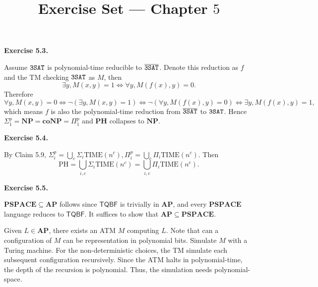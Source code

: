 \documentclass[a4paper]{article}
\title{Exercise Set --- Chapter $5$}
\date{}
\newenvironment{exercise}[1]{
	\par
	\noindent\textbf{Exercise #1.}\quad
}{
	\par
	\bigskip
}
\newcommand{\pbra}[1]{\left( #1 \right)}
\begin{document}
\maketitle

\begin{exercise}{5.3}
    Assume $\tt 3SAT$ is polynomial-time reducible to $\overline{\tt 3SAT}$. Denote this reduction as $f$ and the TM checking
    $\tt 3SAT$ as $M$, then
    $$
    \exists y,M(x,y)=1\iff \forall y,M(f(x),y)=0.
    $$
    Therefore
    $$
    \forall y,M(x,y)=0\iff\neg\pbra{\exists y,M(x,y)=1}\iff\neg\pbra{\forall y,M(f(x),y)=0}\iff\exists y,M(f(x),y)=1,
    $$
    which means $f$ is also the polynomial-time reduction from $\overline{\tt 3SAT}$ to $\tt 3SAT$.
    Hence $\Sigma_1^p=\mathbf{NP}=\mathbf{coNP}=\Pi_1^p$ and $\mathbf{PH}$ collapses to $\mathbf{NP}$.
\end{exercise}

\begin{exercise}{5.4}
    By Claim 5.9, $\Sigma_i^p=\bigcup_c\Sigma_i\text{TIME}(n^c),\Pi_i^p=\bigcup_c\Pi_i\text{TIME}(n^c)$.
    Then 
    $$
    \text{PH}=\bigcup_{i,c}\Sigma_i\text{TIME}(n^c)=\bigcup_{i,c}\Pi_i\text{TIME}(n^c).
    $$
\end{exercise}

\begin{exercise}{5.5}
    $\mathbf{PSPACE} \subseteq \mathbf{AP}$ follows since $\mathsf{TQBF}$ is trivially in $\mathbf{AP}$, and every $\mathbf{PSPACE}$ language reduces to $\mathsf{TQBF}$. It suffices to show that $\mathbf{AP} \subseteq \mathbf{PSPACE}$.

    Given $L \in \mathbf{AP}$, there exists an ATM $M$ computing $L$. Note that can a configuration of $M$ can be representation in polynomial bits. Simulate $M$ with a Turing machine. For the non-deterministic choices, the TM simulate each subsequent configuration recursively. Since the ATM halts in polynomial-time, the depth of the recursion is polynomial. Thus, the simulation needs polynomial-space.
\end{exercise}
\end{document}
